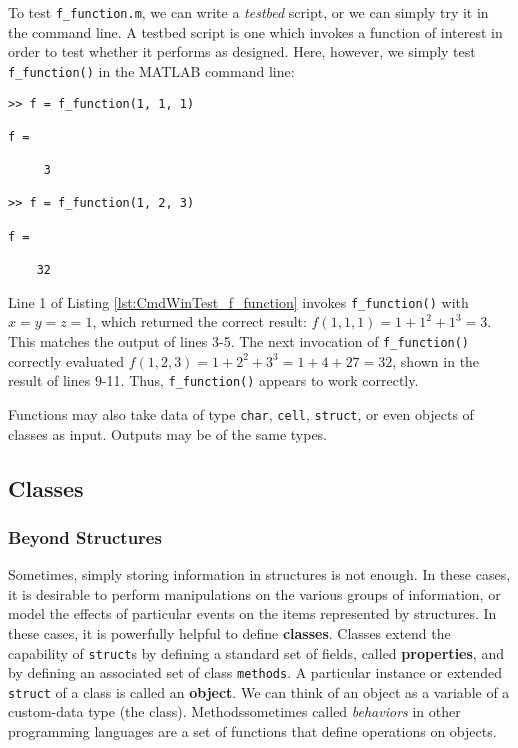 To test \texttt{f\_function.m}, we can write a \textit{testbed} script, or we can simply try it in the command line. A testbed script is one which invokes a function of interest in order to test whether it performs as designed. Here, however, we simply test \texttt{f\_function()} in the MATLAB command line:
\begin{lstlisting}[style=Matlab-editor, caption={MATLAB Command Window input invoking \texttt{f\_function()}, along with the resulting output.}, label={lst:CmdWinTest_f_function}]
>> f = f_function(1, 1, 1)

f =

     3

>> f = f_function(1, 2, 3)

f =

    32
\end{lstlisting}
Line 1 of Listing \ref{lst:CmdWinTest_f_function} invokes \texttt{f\_function()} with $x=y=z=1$, which returned the correct result: $f(1,1,1) = 1 + 1^2 +1^3 = 3$. This matches the output of lines 3-5. The next invocation of \texttt{f\_function()} correctly evaluated $f(1,2,3) = 1 + 2^2 +3^3 = 1 + 4 + 27 = 32$, shown in the result of lines 9-11. Thus, \texttt{f\_function()} appears to work correctly.

Functions may also take data of type \texttt{char}, \texttt{cell}, \texttt{struct}, or even objects of classes as input. Outputs may be of the same types.

\subsection{Classes}

\subsubsection{Beyond Structures}
Sometimes, simply storing information in structures is not enough. In these cases, it is desirable to perform manipulations on the various groups of information, or model the effects of particular events on the items represented by structures. In these cases, it is powerfully helpful to define \textbf{classes}. Classes extend the capability of \texttt{struct}s by defining a standard set of fields, called \textbf{properties}, and by defining an associated set of class \texttt{methods}. A particular instance or extended \texttt{struct} of a class is called an \textbf{object}. We can think of an object as a variable of a custom-data type (the class). Methods\textemdash sometimes called \textit{behaviors} in other programming languages \textemdash are a set of functions that define operations on objects.

